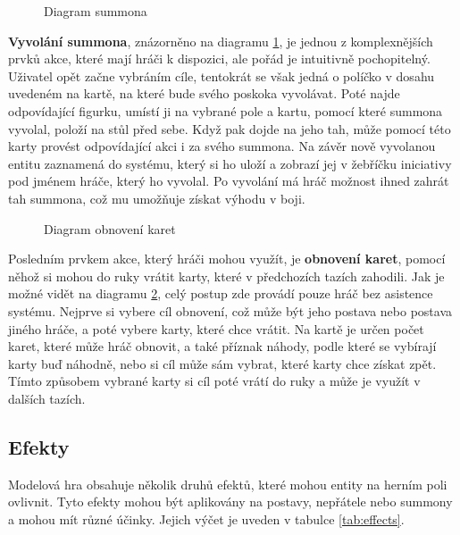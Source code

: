\begin{figure}[h]
    \centering
    \caption{Diagram summona}
    \label{diag:summon}
\end{figure}

\textbf{Vyvolání summona}, znázorněno na diagramu \ref{diag:summon}, je jednou z komplexnějších prvků akce, které mají hráči k dispozici, ale pořád je intuitivně pochopitelný. Uživatel opět začne vybráním cíle, tentokrát se však jedná o políčko v dosahu uvedeném na kartě, na které bude svého poskoka vyvolávat. Poté najde odpovídající figurku, umístí ji na vybrané pole a kartu, pomocí které summona vyvolal, položí na stůl před sebe. Když pak dojde na jeho tah, může pomocí této karty provést odpovídající akci i za svého summona. Na závěr nově vyvolanou entitu zaznamená do systému, který si ho uloží a zobrazí jej v žebříčku iniciativy pod jménem hráče, který ho vyvolal. Po vyvolání má hráč možnost ihned zahrát tah summona, což mu umožňuje získat výhodu v boji.

\begin{figure}[h]
    \centering
    \caption{Diagram obnovení karet}
    \label{diag:restore_cards}
\end{figure}

Posledním prvkem akce, který hráči mohou využít, je \textbf{obnovení karet}, pomocí něhož si mohou do ruky vrátit karty, které v předchozích tazích zahodili. Jak je možné vidět na diagramu \ref{diag:restore_cards}, celý postup zde provádí pouze hráč bez asistence systému. Nejprve si vybere cíl obnovení, což může být jeho postava nebo postava jiného hráče, a poté vybere karty, které chce vrátit. Na kartě je určen počet karet, které může hráč obnovit, a také příznak náhody, podle které se vybírají karty buď náhodně, nebo si cíl může sám vybrat, které karty chce získat zpět. Tímto způsobem vybrané karty si cíl poté vrátí do ruky a může je využít v dalších tazích.



\subsection{Efekty}
\label{subsec:design_effects}

Modelová hra obsahuje několik druhů efektů, které mohou entity na herním poli ovlivnit. Tyto efekty mohou být aplikovány na postavy, nepřátele nebo summony a mohou mít různé účinky. Jejich výčet je uveden v tabulce \ref{tab:effects}.

